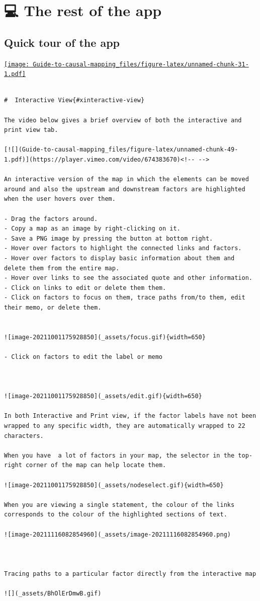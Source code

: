 \documentclass[
]{book}
\begin{document}
\hypertarget{part-the-rest-of-the-app}{%
\part{💻 The rest of the app}\label{part-the-rest-of-the-app}}

\hypertarget{quick-tour}{%
\chapter{Quick tour of the app}\label{quick-tour}}

\href{https://player.vimeo.com/video/674369121}{\texttt{[image: Guide-to-causal-mapping\_files/figure-latex/unnamed-chunk-31-1.pdf]}}

\begin{verbatim}

#  Interactive View{#xinteractive-view}

The video below gives a brief overview of both the interactive and print view tab.

[![](Guide-to-causal-mapping_files/figure-latex/unnamed-chunk-49-1.pdf)](https://player.vimeo.com/video/674383670)<!-- --> 

An interactive version of the map in which the elements can be moved around and also the upstream and downstream factors are highlighted when the user hovers over them.

- Drag the factors around.
- Copy a map as an image by right-clicking on it.
- Save a PNG image by pressing the button at bottom right.
- Hover over factors to highlight the connected links and factors.
- Hover over factors to display basic information about them and delete them from the entire map.
- Hover over links to see the associated quote and other information.
- Click on links to edit or delete them them.
- Click on factors to focus on them, trace paths from/to them, edit their memo, or delete them.


![image-20211001175928850](_assets/focus.gif){width=650}

- Click on factors to edit the label or memo



![image-20211001175928850](_assets/edit.gif){width=650}

In both Interactive and Print view, if the factor labels have not been wrapped to any specific width, they are automatically wrapped to 22 characters.

When you have  a lot of factors in your map, the selector in the top-right corner of the map can help locate them.

![image-20211001175928850](_assets/nodeselect.gif){width=650}

When you are viewing a single statement, the colour of the links corresponds to the colour of the highlighted sections of text.

![image-20211116082854960](_assets/image-20211116082854960.png)



Tracing paths to a particular factor directly from the interactive map

![](_assets/BhOlErDmwB.gif)
\end{verbatim}
\end{document}
